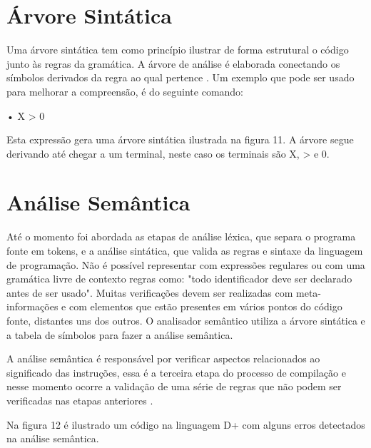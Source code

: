 \documentclass[12pt,oneside,a4paper,chapter=TITLE,section=TITLE,sumario=tradicional]{abntex2}
\begin{document}
\section{Árvore Sintática}
\label{sec:arvoresintaticafuncadamentação}

Uma árvore sintática tem como princípio ilustrar de forma estrutural o código junto às regras da gramática. A árvore de análise é elaborada conectando os símbolos derivados da regra ao qual pertence \cite{appel1998}. Um exemplo que pode ser usado para melhorar a compreensão, é do seguinte comando:

•	X > 0

Esta expressão gera uma árvore sintática ilustrada na figura 11. A árvore segue derivando até chegar a um terminal, neste caso os terminais são X, > e 0.

\begin{figure}[htb]
\end{figure}

\section{Análise Semântica}
\label{sec:analise-semantica}

Até o momento foi abordada as etapas de análise léxica, que separa o programa fonte em tokens, e a análise sintática, que valida as regras e sintaxe da linguagem de programação. Não é possível representar com expressões regulares ou com uma gramática livre de contexto regras como: "todo identificador deve ser declarado antes de ser usado". Muitas verificações devem ser realizadas com meta-informações e com elementos que estão presentes em vários pontos do código fonte, distantes uns dos outros. O analisador semântico utiliza a árvore sintática e a tabela de símbolos para fazer a análise semântica. 

A análise semântica é responsável por verificar aspectos relacionados ao significado das instruções, essa é a terceira etapa do processo de compilação e nesse momento ocorre a validação de uma série de regras que não podem ser verificadas nas etapas anteriores \cite{maragon2015}.

Na figura 12 é ilustrado um código na linguagem D+ com alguns erros detectados na análise semântica.

\begin{figure}[H]
\end{figure}
\end{document}
